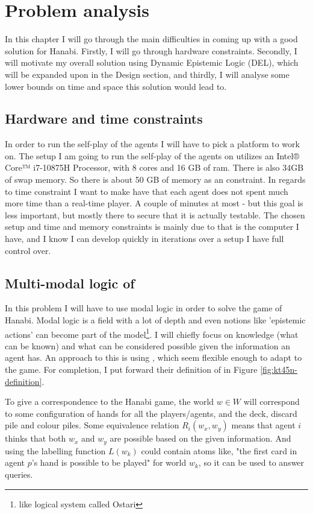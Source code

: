 \section{Problem analysis}

In this chapter I will go through the main difficulties in coming up with a good solution for Hanabi. 
Firstly, I will go through hardware constraints. 
Secondly, I will motivate my overall solution using Dynamic Epistemic Logic (DEL), which will be expanded upon in the Design section, and thirdly, I will analyse some lower bounds on time and space this solution would lead to.


\subsection{Hardware and time constraints}
In order to run the self-play of the agents I will have to pick a platform to work on.
The setup I am going to run the self-play of the agents on utilizes an Intel® Core™ i7-10875H Processor, with 8 cores and 16 GB of ram. 
There is also 34GB of swap memory. 
So there is about 50 GB of memory as an constraint.
In regards to time constraint I want to make have that each agent does not spent much more time than a real-time player. 
A couple of minutes at most - but this goal is less important, but mostly there to secure that it is actually testable.
The chosen setup and time and memory constraints is mainly due to that is the computer I have, and I know I can develop quickly in iterations over a setup I have full control over.

\subsection{Multi-modal logic of \SfiveN{}} \label{sec:definition-ktfourfiven}
In this problem I will have to use modal logic in order to solve the game of Hanabi. 
Modal logic is a field with a lot of depth and even notions like 'epistemic actions' can become part of the model\footnote{like \cite{EgerAndMartens17} logical system called Ostari}. 
I will chiefly focus on knowledge (what can be known) and what can be considered possible given the information an agent has. 
An approach to this is using \SfiveN{} \cite{HuthAndRyan2004KT45n}, which seem flexible enough to adapt to the game. 
For completion, I put forward their definition of \SfiveN{} in Figure \ref{fig:kt45n-definition}. 

To give a correspondence to the Hanabi game, the world $w \in W$ will correspond to some configuration of hands for all the players/agents, and the deck, discard pile and colour piles. 
Some equivalence relation $R_i(w_x,w_y)$ means that agent $i$ thinks that both $w_x$ and $w_y$ are possible based on the given information. 
And using the labelling function $L(w_k)$ could contain atoms like, "the first card in agent $p$'s hand is possible to be played" for world $w_k$, so it can be used to answer queries. 

